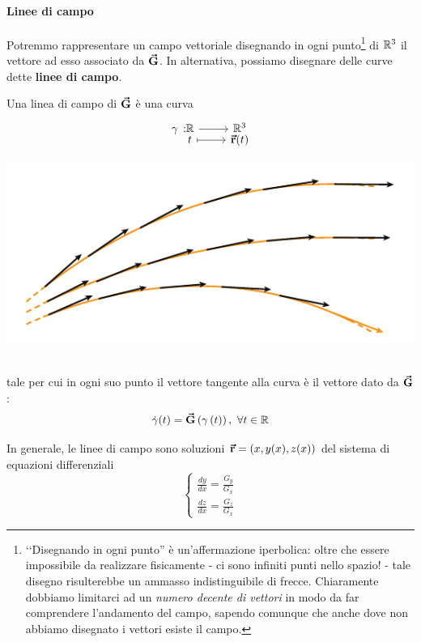 \paragraph{Linee di campo}
Potremmo rappresentare un campo vettoriale disegnando in ogni punto\footnote{ ‘‘Disegnando in ogni punto'' è un'affermazione iperbolica: oltre che essere impossibile da realizzare fisicamente - ci sono infiniti punti nello spazio! - tale disegno risulterebbe un ammasso indistinguibile di frecce. Chiaramente dobbiamo limitarci ad un \textit{numero decente di vettori} in modo da far comprendere l'andamento del campo, sapendo comunque che anche dove non abbiamo disegnato i vettori esiste il campo.} di $\mathbb{R}^3$ il vettore ad esso associato da $\vb*{\va{G}}$. In alternativa, possiamo disegnare delle curve dette \textbf{linee di campo}.
\begin{define}
\begin{minipage}{0.65\textwidth}
	Una linea di campo di $\vb*{\va{G}}$ è una curva 
\begin{equation}
	\funztot[\gamma]{\realset}{\realset^3}{t}{\vba{r}(t)}
\end{equation}
\end{minipage}\hspace{10pt}
\begin{minipage}{0.34\textwidth}
\begin{center}
	\includegraphics[width=1\textwidth]{images/chp1lineedicampo.pdf}
\end{center}
\end{minipage}~\\
tale per cui in ogni suo punto il vettore tangente alla curva è il vettore dato da $\vb*{\va{G}}$:
\begin{equation}
	\dot{\gamma}(t)=\vba{G}\left(\gamma\left(t\right)\right),\ \forall t\in\realset
\end{equation}
\end{define}
In generale, le linee di campo sono soluzioni $\vb*{\va{r}}=\left(x,y(x),z(x)\right)$ del sistema di equazioni differenziali
\begin{equation}
	\begin{cases}
		\frac{dy}{dx}=\frac{G_y}{G_x}\\
		\frac{dz}{dx}=\frac{G_z}{G_x}
	\end{cases}
\end{equation}
